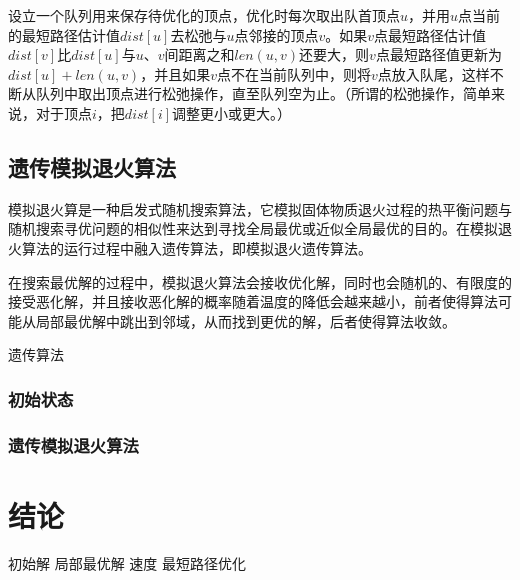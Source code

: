 \documentclass[a4paper,11pt,onecolumn,twoside]{article}
\begin{document}
\begin{multicols}{2}
设立一个队列用来保存待优化的顶点，优化时每次取出队首顶点$u$，并用$u$点当前的最短路径估计值$dist[u]$去松弛与$u$点邻接的顶点$v$。如果$v$点最短路径估计值$dist[v]$比$dist[u]$与$u$、$v$间距离之和$len(u,v)$还要大，则$v$点最短路径值更新为$dist[u]+len(u,v)$，并且如果$v$点不在当前队列中，则将$v$点放入队尾，这样不断从队列中取出顶点进行松弛操作，直至队列空为止。（所谓的松弛操作，简单来说，对于顶点$i$，把$dist[i]$调整更小或更大。）

\subsection{遗传模拟退火算法}

模拟退火算是一种启发式随机搜索算法，它模拟固体物质退火过程的热平衡问题与随机搜索寻优问题的相似性来达到寻找全局最优或近似全局最优的目的。在模拟退火算法的运行过程中融入遗传算法，即模拟退火遗传算法。

在搜索最优解的过程中，模拟退火算法会接收优化解，同时也会随机的、有限度的接受恶化解，并且接收恶化解的概率随着温度的降低会越来越小，前者使得算法可能从局部最优解中跳出到邻域，从而找到更优的解，后者使得算法收敛。

遗传算法

\subsubsection{初始状态}

\subsubsection{遗传模拟退火算法}

\section{结论}
初始解
局部最优解
速度
最短路径优化





\end{multicols}

\clearpage
\end{document}
